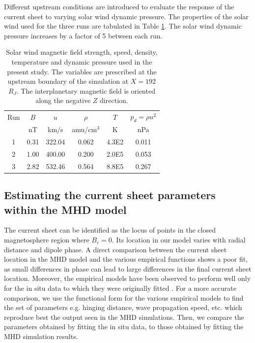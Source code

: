 Different upstream conditions are introduced to evaluate the response of the current sheet to varying solar wind dynamic pressure. The properties of the solar wind used for the three runs are tabulated in Table \ref{tab:sw-conditions-chp6}. The solar wind dynamic pressure increases by a factor of 5 between each run. 

\begin{table}
    \centering
    \begin{tabular}{c|c|c|c|c|c}

    Run  &$B$  &$u$  &$\rho$     &$T$  &$p_d=\rho u^2$\\
         &nT   &km/s &amu/cm$^3$ &K    &nPa\\
    \hline
    1    &0.31  &322.04  &0.062  &4.3E2  &0.011\\
    2    &1.00  &400.00  &0.200  &2.0E5  &0.053\\
    3    &2.82  &532.46  &0.564  &8.8E5  &0.267\\

    \end{tabular}
    \caption{Solar wind magnetic field strength, speed, density, temperature and dynamic pressure used in the present study. The variables are prescribed at the upstream boundary of the simulation at $X=192$ $R_J$. The interplanetary magnetic field is oriented along the negative $Z$ direction.}
    \label{tab:sw-conditions-chp6}
\end{table}

\subsection{Estimating the current sheet parameters within the MHD model}
The current sheet can be identified as the locus of points in the closed magnetosphere region where $B_r=0$. Its location in our model varies with radial distance and dipole phase. A direct comparison between the current sheet location in the MHD model and the various empirical functions shows a poor fit, as small differences in phase can lead to large differences in the final current sheet location. Moreover, the empirical models have been observed to perform well only for the in situ data to which they were originally fitted \cite{Khurana1992a, Behannon1981}. For a more accurate comparison, we use the functional form for the various empirical models to find the set of parameters e.g. hinging distance, wave propagation speed, etc. which reproduce best the output seen in the MHD simulations. Then, we compare the parameters obtained by fitting the in situ data, to those obtained by fitting the MHD simulation results. 

